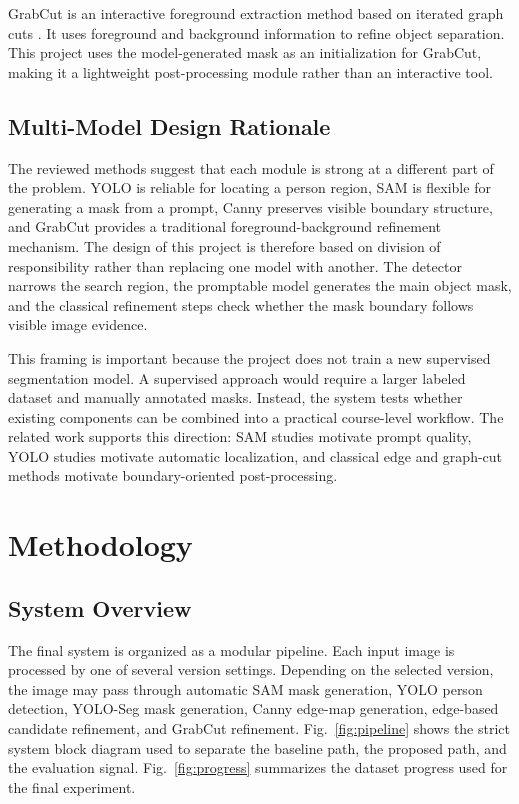 \documentclass[conference]{IEEEtran}
\begin{document}
GrabCut is an interactive foreground extraction method based on iterated graph cuts \cite{rother2004grabcut}. It uses foreground and background information to refine object separation. This project uses the model-generated mask as an initialization for GrabCut, making it a lightweight post-processing module rather than an interactive tool.

\subsection{Multi-Model Design Rationale}
The reviewed methods suggest that each module is strong at a different part of the problem. YOLO is reliable for locating a person region, SAM is flexible for generating a mask from a prompt, Canny preserves visible boundary structure, and GrabCut provides a traditional foreground-background refinement mechanism. The design of this project is therefore based on division of responsibility rather than replacing one model with another. The detector narrows the search region, the promptable model generates the main object mask, and the classical refinement steps check whether the mask boundary follows visible image evidence.

This framing is important because the project does not train a new supervised segmentation model. A supervised approach would require a larger labeled dataset and manually annotated masks. Instead, the system tests whether existing components can be combined into a practical course-level workflow. The related work supports this direction: SAM studies motivate prompt quality, YOLO studies motivate automatic localization, and classical edge and graph-cut methods motivate boundary-oriented post-processing.

\section{Methodology}
\subsection{System Overview}
The final system is organized as a modular pipeline. Each input image is processed by one of several version settings. Depending on the selected version, the image may pass through automatic SAM mask generation, YOLO person detection, YOLO-Seg mask generation, Canny edge-map generation, edge-based candidate refinement, and GrabCut refinement. Fig.~\ref{fig:pipeline} shows the strict system block diagram used to separate the baseline path, the proposed path, and the evaluation signal. Fig.~\ref{fig:progress} summarizes the dataset progress used for the final experiment.
\end{document}
